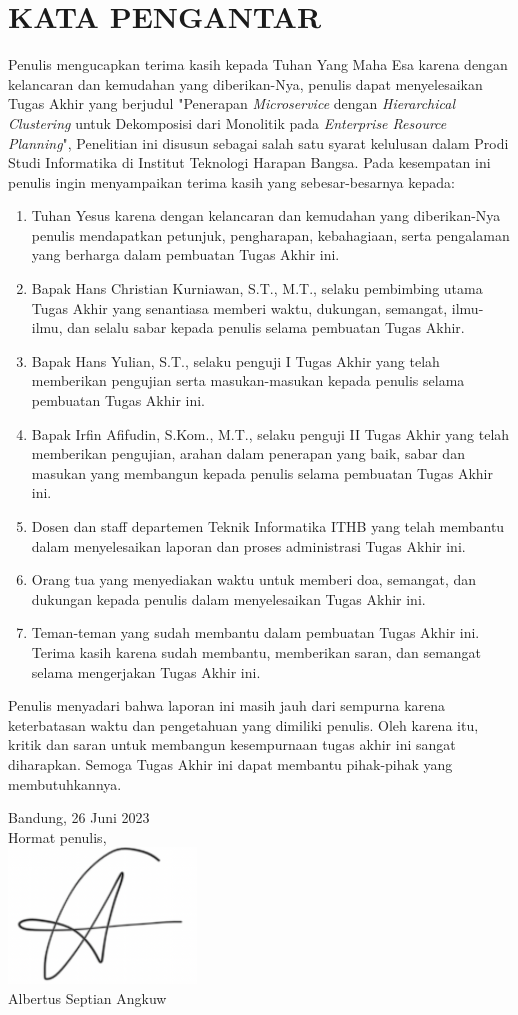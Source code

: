 \chapter*{KATA PENGANTAR}
Penulis mengucapkan terima kasih kepada Tuhan Yang Maha Esa karena dengan kelancaran dan kemudahan yang diberikan-Nya, penulis dapat menyelesaikan Tugas Akhir yang berjudul "Penerapan \textit{Microservice} dengan \textit{Hierarchical Clustering} untuk Dekomposisi dari Monolitik pada \textit{Enterprise Resource Planning}", Penelitian ini disusun sebagai salah satu syarat kelulusan dalam Prodi Studi Informatika di Institut Teknologi Harapan Bangsa. Pada kesempatan ini penulis ingin menyampaikan terima kasih yang sebesar-besarnya kepada: \\

\begin{enumerate}[nolistsep]
    \item Tuhan Yesus karena dengan kelancaran dan kemudahan yang diberikan-Nya penulis mendapatkan petunjuk, pengharapan, kebahagiaan, serta pengalaman yang berharga dalam pembuatan Tugas Akhir ini.
    \item Bapak Hans Christian Kurniawan, S.T., M.T., selaku pembimbing utama Tugas Akhir yang senantiasa memberi waktu, dukungan, semangat, ilmu-ilmu, dan selalu sabar kepada penulis selama pembuatan Tugas Akhir.
    \item Bapak Hans Yulian, S.T., selaku penguji I Tugas Akhir yang telah memberikan pengujian serta masukan-masukan kepada penulis selama pembuatan Tugas Akhir ini.
    \item Bapak Irfin Afifudin, S.Kom., M.T., selaku penguji II Tugas Akhir yang telah memberikan pengujian, arahan dalam penerapan yang baik, sabar dan masukan yang membangun kepada penulis selama pembuatan Tugas Akhir ini.
    \item Dosen dan staff departemen Teknik Informatika ITHB yang telah membantu dalam menyelesaikan laporan dan proses administrasi Tugas Akhir ini.
    \item Orang tua yang menyediakan waktu untuk memberi doa, semangat, dan dukungan kepada penulis dalam menyelesaikan Tugas Akhir ini.
    \item Teman-teman yang sudah membantu dalam pembuatan Tugas Akhir ini. Terima kasih karena sudah membantu, memberikan saran, dan semangat selama mengerjakan Tugas Akhir ini.\\
\end{enumerate}
 
Penulis menyadari bahwa laporan ini masih jauh dari sempurna karena keterbatasan waktu dan pengetahuan yang dimiliki penulis. Oleh karena itu, kritik dan saran untuk membangun kesempurnaan tugas akhir ini sangat diharapkan. Semoga Tugas Akhir ini dapat membantu pihak-pihak yang membutuhkannya.


\hfill{
\begin{flushright} Bandung, 26 Juni 2023\\
Hormat  penulis,\\
\includegraphics[width=5cm]{img/sign.png}\\
Albertus Septian Angkuw
\end{flushright}}
